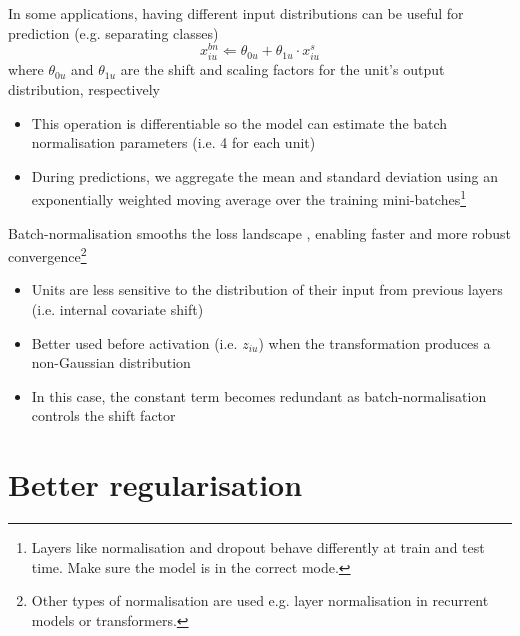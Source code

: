 \documentclass[c]{beamer}
\begin{document}
\begin{frame}{\secsubname}
	In some applications, having different input distributions can be useful for prediction (e.g. separating classes)
	\begin{equation*}
		x^{bn}_{iu} \Leftarrow \theta_{0u} + \theta_{1u} \cdot x^s_{iu}
	\end{equation*}
	where $\theta_{0u}$ and $\theta_{1u}$ are the shift and scaling factors for the unit's output distribution, respectively
	\begin{itemize}
		\item This operation is differentiable so the model can estimate the batch normalisation parameters (i.e. 4 for each unit)
		\item During predictions, we aggregate the mean and standard deviation using an exponentially weighted moving average over the training mini-batches\footnote{Layers like normalisation and dropout behave differently at train and test time. Make sure the model is in the correct mode.}
	\end{itemize}
\end{frame}

\begin{frame}{\secsubname}
	Batch-normalisation smooths the loss landscape \parencite{Santurkar2018}, enabling faster and more robust convergence\footnote{Other types of normalisation are used e.g. layer normalisation in recurrent models or transformers.}
	\begin{itemize}
		\item Units are less sensitive to the distribution of their input from previous layers (i.e. internal covariate shift) %
		\item Better used before activation (i.e. $z_{iu}$) when the transformation produces a non-Gaussian distribution
		\item In this case, the constant term becomes redundant as batch-normalisation controls the shift factor
	\end{itemize}
\end{frame}

\section{Better regularisation}
\end{document}
